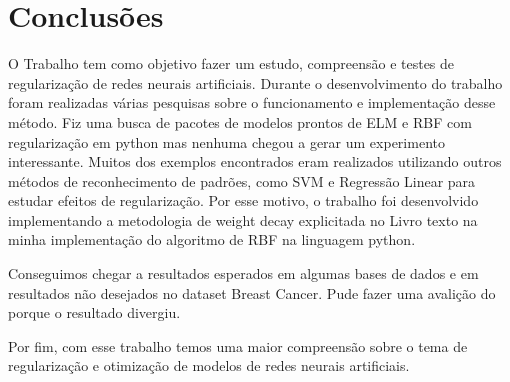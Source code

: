\section{Conclusões}

O Trabalho tem como objetivo fazer um estudo, compreensão e testes de regularização de redes neurais artificiais.
Durante o desenvolvimento do trabalho foram realizadas várias pesquisas sobre o funcionamento e implementação desse método. 
Fiz uma busca de pacotes de modelos prontos de ELM e RBF com regularização em python mas nenhuma chegou a gerar um experimento interessante. Muitos dos exemplos encontrados 
eram realizados utilizando outros métodos de reconhecimento de padrões, como SVM e Regressão Linear para estudar efeitos de regularização. Por esse motivo, o trabalho foi desenvolvido
implementando a metodologia de weight decay explicitada no Livro texto\cite*[]{LivroTexto} na minha implementação do algoritmo de RBF na linguagem python.

Conseguimos chegar a resultados esperados em algumas bases de dados e em resultados não desejados no dataset Breast Cancer. Pude fazer
uma avalição do porque o resultado divergiu. 

Por fim, com esse trabalho temos uma maior compreensão sobre o tema de regularização e otimização de modelos de redes neurais artificiais.
